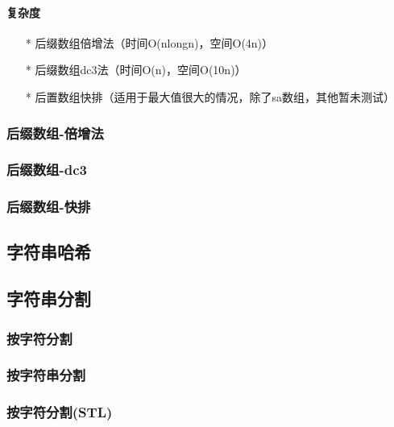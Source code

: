 \paragraph{复杂度}
\begin{itemize}
    \item[*] 后缀数组倍增法（时间O(nlongn)，空间O(4n)）
    \item[*] 后缀数组dc3法（时间O(n)，空间O(10n)）
    \item[*] 后置数组快排（适用于最大值很大的情况，除了sa数组，其他暂未测试）
\end{itemize}

\subsubsection{后缀数组-倍增法}


\subsubsection{后缀数组-dc3}


\subsubsection{后缀数组-快排}


\subsection{字符串哈希}


\subsection{字符串分割}

\subsubsection{按字符分割}


\subsubsection{按字符串分割}


\subsubsection{按字符分割(STL)}


